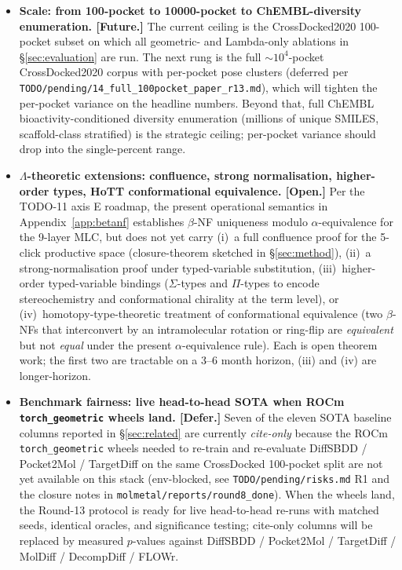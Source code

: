 \begin{itemize}
  \item \textbf{Scale: from 100-pocket to 10000-pocket to ChEMBL-diversity enumeration.
    [Future.]} The current ceiling is the CrossDocked2020 100-pocket
    subset on which all geometric- and Lambda-only ablations in
    \S\ref{sec:evaluation} are run.  The next rung is the full
    $\sim 10^4$-pocket CrossDocked2020 corpus with per-pocket pose
    clusters (deferred per
    \texttt{TODO/pending/14\_full\_100pocket\_paper\_r13.md}), which
    will tighten the per-pocket variance on the headline numbers.
    Beyond that, full ChEMBL bioactivity-conditioned diversity
    enumeration (millions of unique SMILES, scaffold-class stratified)
    is the strategic ceiling; per-pocket variance should drop into
    the single-percent range.

  \item \textbf{$\Lambda$-theoretic extensions: confluence, strong normalisation,
    higher-order types, HoTT conformational equivalence.
    [Open.]} Per the TODO-11 axis E roadmap, the present operational
    semantics in Appendix~\ref{app:betanf} establishes $\beta$-NF
    uniqueness modulo $\alpha$-equivalence for the 9-layer MLC, but
    does not yet carry (i)~a full confluence proof for the 5-click
    productive space (closure-theorem sketched in \S\ref{sec:method}),
    (ii)~a strong-normalisation proof under typed-variable
    substitution, (iii)~higher-order typed-variable bindings
    ($\Sigma$-types and $\Pi$-types to encode stereochemistry and
    conformational chirality at the term level), or
    (iv)~homotopy-type-theoretic treatment of conformational
    equivalence (two $\beta$-NFs that interconvert by an
    intramolecular rotation or ring-flip are \emph{equivalent} but
    not \emph{equal} under the present $\alpha$-equivalence rule).
    Each is open theorem work; the first two are tractable on a
    3--6 month horizon, (iii) and (iv) are longer-horizon.

  \item \textbf{Benchmark fairness: live head-to-head SOTA when ROCm
    \texttt{torch\_geometric} wheels land.  [Defer.]}
    Seven of the eleven SOTA baseline columns reported in
    \S\ref{sec:related} are currently \emph{cite-only} because the
    ROCm \texttt{torch\_geometric} wheels needed to re-train and
    re-evaluate DiffSBDD / Pocket2Mol / TargetDiff on the same
    CrossDocked 100-pocket split are not yet available on this
    stack (env-blocked, see \texttt{TODO/pending/risks.md} R1 and
    the closure notes in \texttt{molmetal/reports/round8\_done}).
    When the wheels land, the Round-13 protocol is ready for live
    head-to-head re-runs with matched seeds, identical oracles, and
    significance testing; cite-only columns will be replaced by
    measured $p$-values against DiffSBDD / Pocket2Mol / TargetDiff /
    MolDiff / DecompDiff / FLOWr.


\end{itemize}
